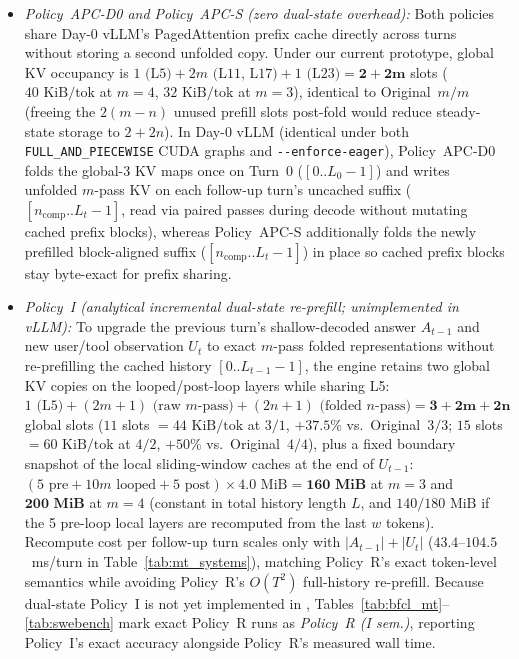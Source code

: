 \documentclass[11pt]{article}
\begin{document}
\begin{itemize}
\item \emph{Policy~APC-D0 and Policy~APC-S (zero dual-state overhead):} Both policies share Day-0 vLLM's PagedAttention
prefix cache directly across turns without storing a second unfolded copy. Under our current prototype, global KV
occupancy is $1\text{ (L5)} + 2m\text{ (L11, L17)} + 1\text{ (L23)} = \mathbf{2+2m}$ slots ($40\text{ KiB/tok}$ at
$m{=}4$, $32\text{ KiB/tok}$ at $m{=}3$), identical to Original~$m/m$ (freeing the $2(m{-}n)$ unused prefill slots
post-fold would reduce steady-state storage to $2{+}2n$). In Day-0 vLLM (identical under both \texttt{FULL\_AND\_PIECEWISE} CUDA graphs and \texttt{-\/-enforce-eager}),
Policy~APC-D0 folds the global-3 KV maps once on Turn~0 ($[0..L_0{-}1]$) and writes unfolded $m$-pass KV on each
follow-up turn's uncached suffix ($[n_{\text{comp}}..L_t{-}1]$, read via paired passes during decode without mutating
cached prefix blocks), whereas Policy~APC-S additionally folds the newly prefilled block-aligned suffix
($[n_{\text{comp}}..L_t{-}1]$) in place so cached prefix blocks stay byte-exact for prefix sharing.
\item \emph{Policy~I (analytical incremental dual-state re-prefill; unimplemented in vLLM):} To upgrade the previous turn's shallow-decoded answer
$A_{t-1}$ and new user/tool observation $U_t$ to exact $m$-pass folded representations without re-prefilling the cached
history $[0..L_{t-1}{-}1]$, the engine retains two global KV copies on the looped/post-loop layers while sharing L5:
$1\text{ (L5)} + (2m{+}1)\text{ (raw }m\text{-pass)} + (2n{+}1)\text{ (folded }n\text{-pass)} = \mathbf{3+2m+2n}$
global slots ($11$ slots $= 44\text{ KiB/tok}$ at $3/1$, $+37.5\%$ vs.\ Original~$3/3$; $15$ slots $= 60\text{ KiB/tok}$
at $4/2$, $+50\%$ vs.\ Original~$4/4$), plus a fixed boundary snapshot of the local sliding-window caches at the end of
$U_{t-1}$: $(5\text{ pre} + 10m\text{ looped} + 5\text{ post}) \times 4.0\text{ MiB} = \mathbf{160\text{ MiB}}$ at
$m{=}3$ and $\mathbf{200\text{ MiB}}$ at $m{=}4$ (constant in total history length $L$, and $140/180\text{ MiB}$ if the
5 pre-loop local layers are recomputed from the last $w$ tokens). Recompute cost per follow-up turn scales only with
$|A_{t-1}|+|U_t|$ ($43.4$--$104.5$~ms/turn in Table~\ref{tab:mt_systems}), matching Policy~R's exact token-level
semantics while avoiding Policy~R's $O(T^2)$ full-history re-prefill. Because dual-state Policy~I is not yet
implemented in , Tables~\ref{tab:bfcl_mt}--\ref{tab:swebench} mark exact Policy~R runs as
\emph{Policy~R (I sem.)}, reporting Policy~I's exact accuracy alongside Policy~R's measured wall time.
\end{itemize}
\end{document}
